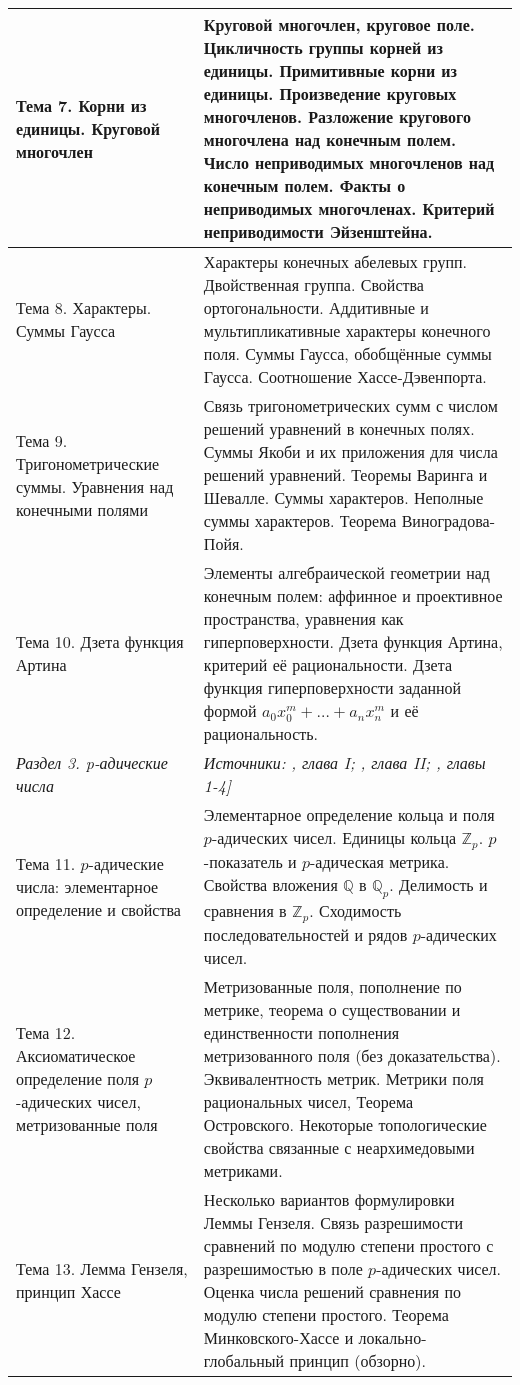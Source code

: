 \documentclass[a4paper, 12pt]{article}
\begin{document}
\begin{longtable}{ | >{\raggedright}p{6cm} | p{9cm} | }
    Тема 7. Корни из единицы. Круговой многочлен & Круговой многочлен, круговое поле. Цикличность группы корней из единицы. Примитивные корни из единицы. Произведение круговых многочленов. Разложение кругового многочлена над конечным полем. Число неприводимых многочленов над конечным полем. Факты о неприводимых многочленах. Критерий неприводимости Эйзенштейна. \\ \hline
    Тема 8. Характеры. Суммы Гаусса & Характеры конечных абелевых групп. Двойственная группа. Свойства ортогональности. Аддитивные и мультипликативные характеры конечного поля. Суммы Гаусса, обобщённые суммы Гаусса. Соотношение Хассе-Дэвенпорта. \\ \hline
    Тема 9. Тригонометрические суммы. Уравнения над конечными полями & Связь тригонометрических сумм с числом решений уравнений в конечных полях. Суммы Якоби и их приложения для числа решений уравнений. Теоремы Варинга и Шевалле. Суммы характеров. Неполные суммы характеров. Теорема Виноградова-Пойя. \\ \hline
    Тема 10. Дзета функция Артина & Элементы алгебраической геометрии над конечным полем: аффинное и проективное пространства, уравнения как гиперповерхности. Дзета функция Артина, критерий её рациональности.  Дзета функция гиперповерхности заданной формой $a_0 x_0^m + \dots + a_n x_n^m$ и её рациональность. \\ \hline
    \textit{Раздел 3. p-адические числа} & \textit{Источники: \cite{BSh}, глава I; \cite{Serre}, глава II; \cite{Gouv}, главы 1-4]} \\ \hline
    Тема 11. $p$-адические числа: элементарное определение и свойства & Элементарное определение кольца и поля $p$-адических чисел. Единицы кольца $\mathbb{Z}_p$. $p$-показатель и $p$-адическая метрика. Свойства вложения $\mathbb{Q}$ в $\mathbb{Q}_p$. Делимость и сравнения в $\mathbb{Z}_p$. Сходимость последовательностей и рядов $p$-адических чисел. \\ \hline
    Тема 12. Аксиоматическое определение поля $p$-адических чисел, метризованные поля & Метризованные поля, пополнение по метрике, теорема о существовании и единственности пополнения метризованного поля (без доказательства). Эквивалентность метрик. Метрики поля рациональных чисел, Теорема Островского. Некоторые топологические свойства связанные с неархимедовыми метриками.  \\ \hline
    Тема 13. Лемма Гензеля, принцип Хассе & Несколько вариантов формулировки Леммы Гензеля. Связь разрешимости сравнений по модулю степени простого с разрешимостью в поле $p$-адических чисел. Оценка числа решений сравнения по модулю степени простого. Теорема Минковского-Хассе и локально-глобальный принцип (обзорно). \\ \hline

\end{longtable}
\end{document}
